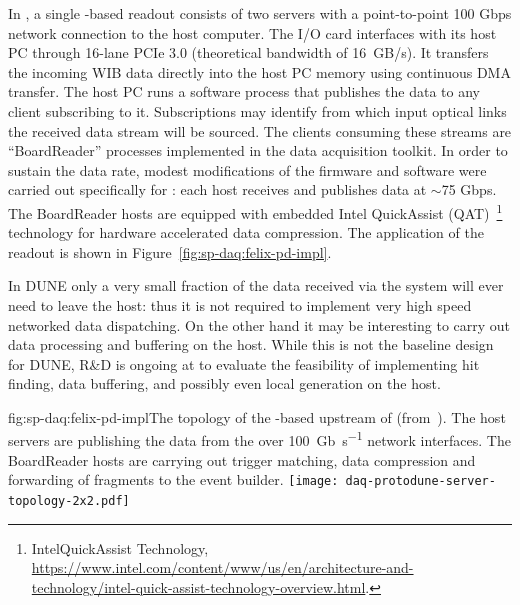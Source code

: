 In , a single  -based readout consists of two servers with a point-to-point 100 Gbps network connection to the  host computer.
The  I/O card interfaces with its host PC through 16-lane PCIe 3.0 (theoretical bandwidth of \SI{16}{GB/s}).
It transfers the incoming WIB data directly into the host PC memory using continuous DMA transfer. The  host PC runs a software process that publishes the data to any client subscribing to it.
Subscriptions may identify from which input optical links the received data stream will be sourced.
The clients consuming these streams are ``BoardReader'' processes implemented in the  data acquisition toolkit.
In order to sustain the data rate, modest modifications of the firmware and software were carried out specifically for : each  host receives and publishes data at $\sim$75 Gbps. The BoardReader hosts are equipped with embedded Intel QuickAssist (QAT)~\footnote{Intel\textregistered QuickAssist Technology, \url{https://www.intel.com/content/www/us/en/architecture-and-technology/intel-quick-assist-technology-overview.html}.} technology for hardware accelerated data compression. The  application of the   readout is shown in Figure~\ref{fig:sp-daq:felix-pd-impl}.


In DUNE only a very small fraction of the data received via the 
system will ever need to leave the host: thus it is not required to
implement very high speed networked data dispatching. On the other
hand it may be interesting to carry out data processing and buffering
on the host. While this is not the baseline design for DUNE, R\&D is
ongoing at  to evaluate the feasibility of
implementing hit finding, data buffering, and possibly even local
 generation on the  host. 


\begin{dunefigure}{fig:sp-daq:felix-pd-impl}{The topology of the -based
    upstream  of  (from~\cite{pdsp-felix}). The  host servers are publishing the data from the  over \SI{100}{Gb\per\second} network interfaces. The BoardReader hosts are carrying out trigger matching, data compression and forwarding of fragments to the event builder.}
  \texttt{[image: daq-protodune-server-topology-2x2.pdf]}
\end{dunefigure}

